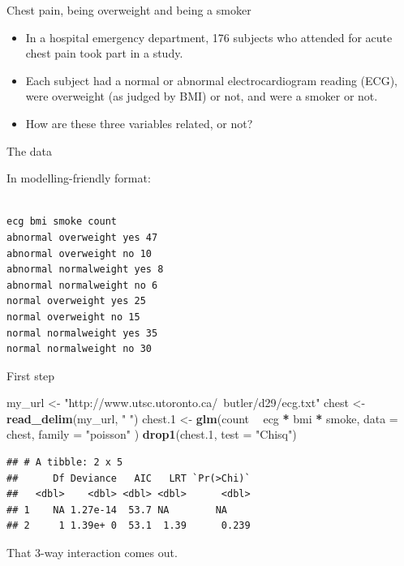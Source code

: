 \documentclass[
  ignorenonframetext,
]{beamer}
\newenvironment{Shaded}{\begin{snugshade}}{\end{snugshade}}
\newcommand{\DataTypeTok}[1]{\textcolor[rgb]{0.13,0.29,0.53}{#1}}
\newcommand{\FloatTok}[1]{\textcolor[rgb]{0.00,0.00,0.81}{#1}}
\newcommand{\KeywordTok}[1]{\textcolor[rgb]{0.13,0.29,0.53}{\textbf{#1}}}
\newcommand{\NormalTok}[1]{#1}
\newcommand{\OperatorTok}[1]{\textcolor[rgb]{0.81,0.36,0.00}{\textbf{#1}}}
\newcommand{\StringTok}[1]{\textcolor[rgb]{0.31,0.60,0.02}{#1}}
\begin{document}
\begin{frame}{Chest pain, being overweight and being a smoker}
\protect\hypertarget{chest-pain-being-overweight-and-being-a-smoker}{}

\begin{itemize}
\item
  In a hospital emergency department, 176 subjects who attended for
  acute chest pain took part in a study.
\item
  Each subject had a normal or abnormal electrocardiogram reading (ECG),
  were overweight (as judged by BMI) or not, and were a smoker or not.
\item
  How are these three variables related, or not?
\end{itemize}

\end{frame}

\begin{frame}[fragile]{The data}
\protect\hypertarget{the-data-13}{}

In modelling-friendly format:

\begin{verbatim}

ecg bmi smoke count
abnormal overweight yes 47
abnormal overweight no 10
abnormal normalweight yes 8 
abnormal normalweight no 6
normal overweight yes 25 
normal overweight no 15 
normal normalweight yes 35
normal normalweight no 30
\end{verbatim}

\end{frame}

\begin{frame}[fragile]{First step}
\protect\hypertarget{first-step}{}

\small

\begin{Shaded}
\begin{Highlighting}[]
\NormalTok{my_url <-}\StringTok{ "http://www.utsc.utoronto.ca/~butler/d29/ecg.txt"}
\NormalTok{chest <-}\StringTok{ }\KeywordTok{read_delim}\NormalTok{(my_url, }\StringTok{" "}\NormalTok{)}
\NormalTok{chest}\FloatTok{.1}\NormalTok{ <-}\StringTok{ }\KeywordTok{glm}\NormalTok{(count }\OperatorTok{~}\StringTok{ }\NormalTok{ecg }\OperatorTok{*}\StringTok{ }\NormalTok{bmi }\OperatorTok{*}\StringTok{ }\NormalTok{smoke,}
  \DataTypeTok{data =}\NormalTok{ chest,}
  \DataTypeTok{family =} \StringTok{"poisson"}
\NormalTok{)}
\KeywordTok{drop1}\NormalTok{(chest}\FloatTok{.1}\NormalTok{, }\DataTypeTok{test =} \StringTok{"Chisq"}\NormalTok{)}
\end{Highlighting}
\end{Shaded}

\begin{verbatim}
## # A tibble: 2 x 5
##      Df Deviance   AIC   LRT `Pr(>Chi)`
##   <dbl>    <dbl> <dbl> <dbl>      <dbl>
## 1    NA 1.27e-14  53.7 NA        NA    
## 2     1 1.39e+ 0  53.1  1.39      0.239
\end{verbatim}

\normalsize

That 3-way interaction comes out.

\end{frame}
\end{document}
